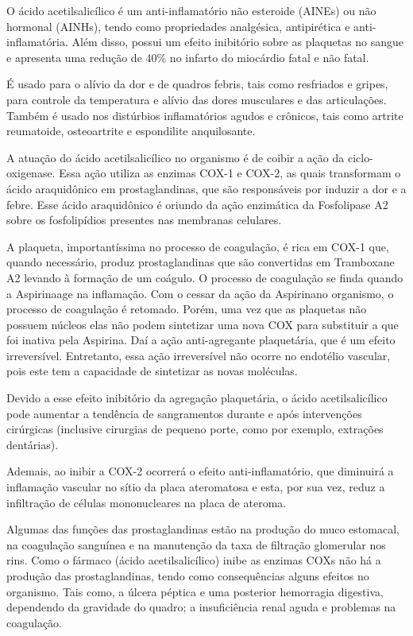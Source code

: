 O ácido acetilsalicílico é um anti-inflamatório não esteroide (AINEs) ou não hormonal (AINHs), tendo
como propriedades analgésica, antipirética e anti-inflamatória. Além disso, possui um efeito
inibitório sobre as plaquetas no sangue e apresenta uma redução de 40\% no infarto do miocárdio
fatal e não fatal.~\cite{Palomo2008}

É usado para o alívio da dor e de quadros febris, tais como resfriados e gripes, para controle da
temperatura e alívio das dores musculares e das articulações. Também é usado nos distúrbios
inflamatórios agudos e crônicos, tais como artrite reumatoide, osteoartrite e espondilite
anquilosante.~\cite{bulaaspirina}

A atuação do ácido acetilsalicílico no organismo é de coibir a ação da ciclo-oxigenase. Essa ação
utiliza as enzimas COX-1 e COX-2, as quais transformam o ácido araquidônico em prostaglandinas, que
são responsáveis por induzir a dor e a febre. Esse ácido araquidônico é oriundo da ação enzimática
da Fosfolipase A2 sobre os fosfolipídios presentes nas membranas celulares. 

A plaqueta, importantíssima no processo de coagulação, é rica em COX-1 que, quando necessário,
produz prostaglandinas que são convertidas em Tramboxane A2 levando à formação de um coágulo. O
processo de coagulação se finda quando a Aspirina\R age na inflamação. Com o cessar da ação da
Aspirina\R no organismo, o processo de coagulação é retomado. Porém, uma vez que as plaquetas não
possuem núcleos elas não podem sintetizar uma nova COX para substituir a que foi inativa pela
Aspirina\R. Daí a ação anti-agregante plaquetária, que é um efeito irreversível. Entretanto, essa
ação irreversível não ocorre no endotélio vascular, pois este tem a capacidade de sintetizar as
novas moléculas. 

Devido a esse efeito inibitório da agregação plaquetária, o ácido acetilsalicílico pode aumentar a
tendência de sangramentos durante e após intervenções cirúrgicas (inclusive cirurgias de pequeno
porte, como por exemplo, extrações dentárias).~\cite{bulaaspirina}

Ademais, ao inibir a COX-2 ocorrerá o efeito anti-inflamatório, que diminuirá a inflamação vascular
no sítio da placa ateromatosa e esta, por sua vez, reduz a infiltração de células mononucleares na
placa de ateroma.~\cite{Grassi2012}

Algumas das funções das prostaglandinas estão na produção do muco estomacal, na coagulação sanguínea
e na manutenção da taxa de filtração glomerular nos rins. Como o fármaco (ácido acetilsalicílico)
inibe as enzimas COXs não há a produção das prostaglandinas, tendo como consequências alguns efeitos
no organismo.  Tais como, a úlcera péptica e uma posterior hemorragia digestiva, dependendo da
gravidade do quadro; a insuficiência renal aguda e problemas na coagulação. 


